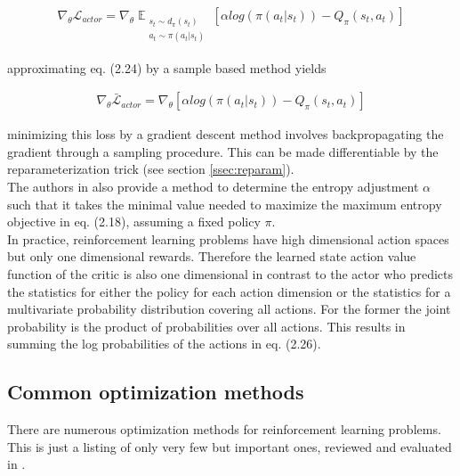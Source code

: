 \begin{align}
\nabla_\theta \mathcal{L}_{actor} = \nabla_\theta \mathop{\mathbb{E}}_{\substack{s_t \sim d_\pi(s_t) \\ a_t \sim \pi(a_t|s_t)}} \left[ \alpha log(\pi(a_t|s_t)) - Q_\pi(s_t, a_t) \right]
\end{align}

approximating eq. (2.24) by a sample based method yields

\begin{align}
\nabla_\theta \bar{\mathcal{L}}_{actor} = \nabla_\theta \left[ \alpha log(\pi(a_t|s_t)) - Q_\pi(s_t, a_t) \right]
\end{align}

minimizing this loss by a gradient descent method involves backpropagating the gradient through a sampling procedure. This can be made differentiable by the reparameterization trick (see section \ref{ssec:reparam}).\\
The authors in \cite{haarnoja2018soft} also provide a method to determine the entropy adjustment $\alpha$ such that it takes the minimal value needed to maximize the maximum entropy objective in eq. (2.18), assuming a fixed policy $\pi$.\\
In practice, reinforcement learning problems have high dimensional action spaces but only one dimensional rewards. Therefore the learned state action value function of the critic is also one dimensional in contrast to the actor who predicts the statistics for either the policy for each action dimension or the statistics for a multivariate probability distribution covering all actions. For the former the joint probability is the product of probabilities over all actions. This results in summing the log probabilities of the actions in eq. (2.26).

\subsection{Common optimization methods}\label{ssec:common_opt}
There are numerous optimization methods for reinforcement learning problems. This is just a listing of only very few but important ones, reviewed and evaluated in \cite{hessel2017rainbow}.

